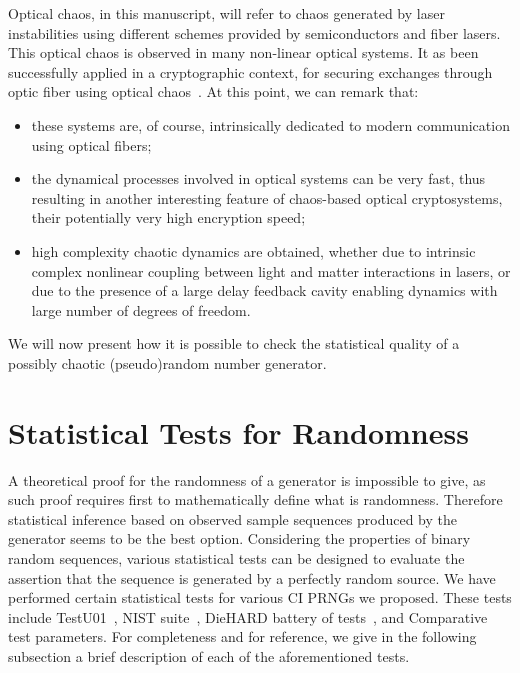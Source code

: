 Optical chaos, in this manuscript, will refer to chaos generated by laser instabilities using different schemes provided by semiconductors and fiber lasers. This optical chaos is observed in many non-linear optical systems.
It as been successfully applied in a cryptographic
context, for securing exchanges through optic fiber 
using optical chaos~\cite{Larger2004609}.
At this point, we can remark that:
\begin{itemize}
\item these systems are, of course, intrinsically dedicated to modern communication using optical fibers;
\item the dynamical processes involved in optical systems can be very fast, thus resulting in another interesting feature of chaos-based optical cryptosystems, their potentially very high encryption speed;
\item high complexity chaotic dynamics are obtained, whether due to intrinsic complex nonlinear coupling between light and matter interactions in lasers, or due to the presence of a large delay feedback cavity enabling dynamics with large number of degrees of freedom.
\end{itemize}

We will now present how it is possible to check the statistical quality of a
possibly chaotic (pseudo)random number generator.








\section{Statistical Tests for Randomness}
\label{Some famous statistical tests of random number generators}

A theoretical proof for the randomness of a generator is impossible to give, as such proof requires first to mathematically define what is randomness. Therefore statistical inference based on observed sample sequences produced by the generator seems to be the best option. Considering the properties of binary
random sequences, various statistical tests can be designed to evaluate the assertion
that the sequence is generated by a perfectly random source. 
We have performed certain statistical tests for various CI PRNGs we proposed. These tests
include TestU01~\cite{Lecuyer2009}, NIST suite~\cite{ANDREW2008},
DieHARD battery of tests~\cite{Marsaglia1996}, and Comparative test parameters. For completeness and for reference, we give
in the following subsection a brief description of each of the
aforementioned tests.



